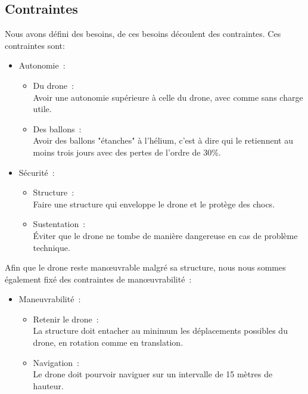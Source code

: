 \documentclass[a4paper,11pt]{article}
\begin{document}
\subsection{Contraintes}
Nous avons défini des besoins, de ces besoins découlent des contraintes. Ces contraintes sont:
\begin{itemize}
	\item Autonomie~:
		\begin{itemize}
			\item Du drone~:\\
			Avoir une autonomie supérieure à celle du drone, avec comme sans charge utile.
			\item Des ballons~:\\
			Avoir des ballons "étanches" à l'hélium, c'est à dire qui le retiennent au moins trois jours avec des pertes de l'ordre de 30\%.
		\end{itemize}
	\item Sécurité~:
		\begin{itemize}
			\item Structure~:\\
				Faire une structure qui enveloppe le drone et le protège des chocs.
			\item Sustentation~:\\
				Éviter que le drone ne tombe de manière dangereuse en cas de problème technique.
		\end{itemize}
	\end{itemize}
	Afin que le drone reste manœuvrable malgré sa structure, nous nous sommes également fixé des contraintes de manœuvrabilité~:
	\begin{itemize}
		\item Maneuvrabilité~:
			\begin{itemize}
				\item Retenir le drone~:\\
					La structure doit entacher au minimum les déplacements possibles du drone, en rotation comme en translation.
				\item Navigation~:\\
					Le drone doit pourvoir naviguer sur un intervalle de 15 mètres de hauteur.
			\end{itemize}
	\end{itemize}
\end{document}
